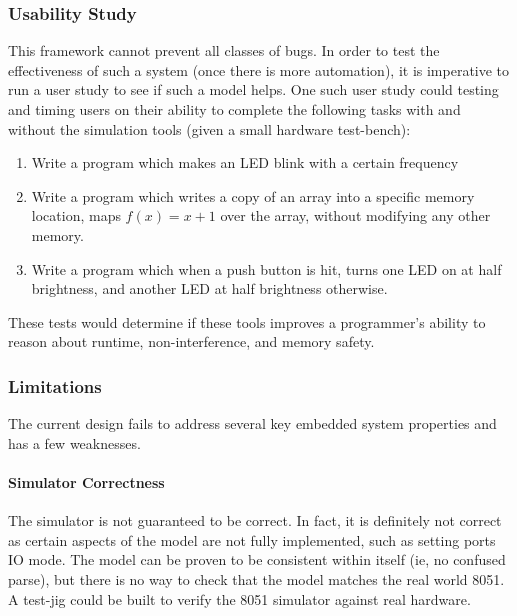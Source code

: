 \documentclass[preprint,12pt]{sigplanconf}
\begin{document}
\subsubsection{Usability Study}
This framework cannot prevent all classes of bugs. In order to test
the effectiveness of such a system (once there is more automation), it
is imperative to run a user study to see if such a model helps. One
such user study could testing and timing users on their ability to
complete the following tasks with and without the simulation tools
(given a small hardware test-bench):
\begin{enumerate}
\item
  Write a program which makes an LED blink with a certain frequency
\item
  Write a program which writes a copy of an array into a specific
  memory location, maps $f(x) = x+1$ over the array, without modifying
  any other memory.
\item
  Write a program which when a push button is hit, turns one LED on at
  half brightness, and another LED at half brightness otherwise.
\end{enumerate}
These tests would determine if these tools improves a programmer's
ability to reason about runtime, non-interference, and memory safety.



\subsubsection{Limitations}
The current design fails to address several key
embedded system properties and has a few weaknesses.

\paragraph{Simulator Correctness}
The simulator is not guaranteed to be correct. In fact, it is
definitely not correct as certain aspects of the model are not fully
implemented, such as setting ports IO mode. The model can be proven to
be consistent within itself (ie, no confused parse), but there is no
way to check that the model matches the real world 8051. A test-jig
could be built to verify the 8051 simulator against real hardware.
\end{document}
